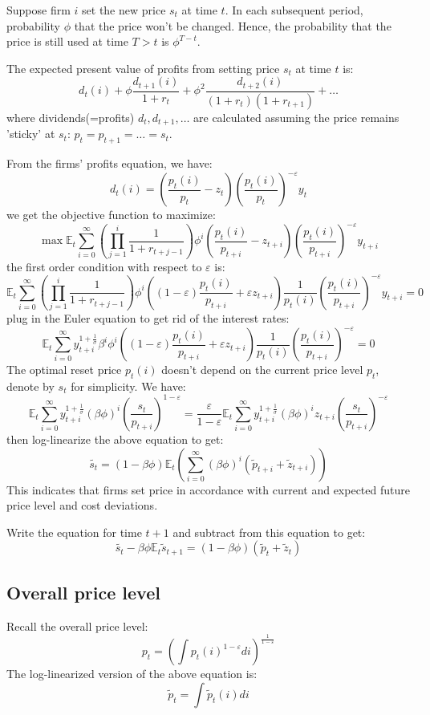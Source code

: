 Suppose firm $i$ set the new price $s_t$ at time $t$.
In each subsequent period, probability $\phi $ that the price won't be changed.
Hence, the probability that the price is still used at time $T>t$ is $\phi^{T-t}$.

The expected present value of profits from setting price $s_t$ at time $t$ is:
\[
d_t(i) + \phi \frac{d_{t+1}(i)}{1+r_t} + \phi^2 \frac{d_{t+2}(i)}{(1+r_t)(1+r_{t+1})} + \ldots
\]
where dividends(=profits) $d_t, d_{t+1}, \ldots$ are calculated assuming the price remains 'sticky' at $s_t$:
$p_t = p_{t+1} = \ldots = s_t.$

From the firms' profits equation, we have:
\[
d_t(i) = \left(\frac{p_t(i)}{p_t} - z_t\right)\left(\frac{p_t(i)}{p_t}\right)^{-\varepsilon}y_t
\]
we get the objective function to maximize:
\[
\max \mathbb{E}_t \sum_{i=0}^{\infty} \left(\prod_{j=1}^{i}\frac{1}{1+r_{t+j-1} }\right) \phi^{i} \left(\frac{p_t(i)}{p_{t+i}} - z_{t+i}\right)\left(\frac{p_t(i)}{p_{t+i}}\right)^{-\varepsilon}y_{t+i}
\]
the first order condition with respect to $\varepsilon$ is:
\[
\mathbb{E}_t \sum_{i=0}^{\infty} \left(\prod_{j=1}^{i}\frac{1}{1+r_{t+j-1} }\right) \phi^{i} \left((1-\varepsilon)\frac{p_t(i)}{p_{t+i}} + \varepsilon z_{t+i}\right) \frac{1}{p_t(i)} \left(\frac{p_t(i)}{p_{t+i}}\right)^{-\varepsilon}y_{t+i} = 0
\]
plug in the Euler equation to get rid of the interest rates:
\[
\mathbb{E}_t \sum_{i=0}^{\infty} y_{t+i}^{1+\frac{1}{\sigma}}  \beta^{i} \phi^{i} \left((1-\varepsilon)\frac{p_t(i)}{p_{t+i}} + \varepsilon z_{t+i}\right) \frac{1}{p_t(i)} \left(\frac{p_t(i)}{p_{t+i}}\right)^{-\varepsilon}= 0
\]
The optimal reset price $p_t(i)$ doesn't depend on the current price level $p_t$, denote by $s_t$ for simplicity.
We have:
\[
\mathbb{E}_t \sum_{i=0}^{\infty} y_{t+i}^{1+\frac{1}{\sigma}} (\beta\phi)^{i} \left(\frac{s_t}{p_{t+i}}\right)^{1-\varepsilon} = \frac{\varepsilon}{1-\varepsilon} \mathbb{E}_t \sum_{i=0}^{\infty} y_{t+i}^{1+\frac{1}{\sigma}} (\beta\phi)^{i} z_{t+i} \left(\frac{s_t}{p_{t+i}}\right)^{-\varepsilon}
\]
then log-linearize the above equation to get:
\[
\tilde{s_t} = (1 - \beta \phi)\mathbb{E}_t\left(\sum_{i=0}^{\infty}(\beta \phi)^i(\tilde{p}_{t+i}+\tilde{z}_{t+i}) \right)
\]
This indicates that firms set price in accordance with current and expected future price level and cost deviations.

Write the equation for time $t+1$ and subtract from this equation to get:
\[
\tilde{s_t} - \beta \phi\mathbb{E}_t \tilde{s}_{t+1} = (1-\beta \phi)(\tilde{p}_t + \tilde{z}_t)
\]

\subsection{Overall price level}
Recall the overall price level:
\[
p_t = \left( \int p_t(i)^{1-\varepsilon} di \right)^{\frac{1}{1-\varepsilon}}
\]
The log-linearized version of the above equation is:
\[
\tilde{p}_t = \int \tilde{p}_t(i)di
\]

